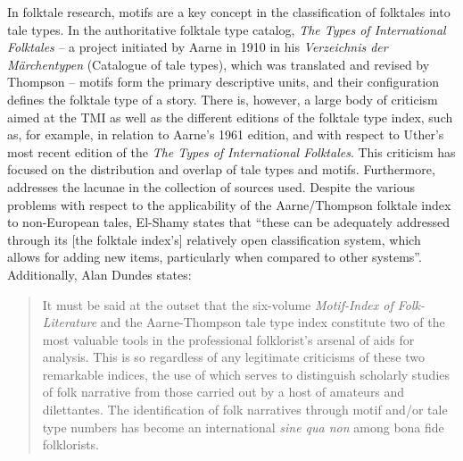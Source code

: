 In folktale research, motifs are a key concept in the classification of folktales into tale types. In the authoritative folktale type catalog, \emph{The Types of International Folktales}\autocite{uther:2004} -- a project initiated by Aarne in 1910 in his \emph{Verzeichnis der Märchentypen} (Catalogue of tale types)\autocite{aarne:1910}, which was translated and revised by Thompson\autocite{aarne:1928,aarne:1961} -- motifs form the primary descriptive units, and their configuration defines the folktale type of a story. There is, however, a large body of criticism aimed at the TMI as well as the different editions of the folktale type index, such as, for example, \citeauthor{dundes:1997} in relation to Aarne's 1961 edition\autocite{dundes:1997}, and \citeauthor{karsdorp:2012} with respect to Uther's most recent edition of the \emph{The Types of International Folktales}\autocite{karsdorp:2012}. This criticism has focused on the distribution and overlap of tale types and motifs. Furthermore, \citeauthor{el-shamy:1980} addresses the lacunae in the collection of sources used\autocite{el-shamy:1980}. Despite the various problems with respect to the applicability of the Aarne/Thompson folktale index to non-European tales, El-Shamy states that ``these can be adequately addressed through its [the folktale index's] relatively open classification system, which allows for adding new items, particularly when compared to other systems''\autocite[158]{el-shamy:1988}. Additionally, Alan Dundes states:
\begin{quote}
    It must be said at the outset that the six-volume \emph{Motif-Index of Folk-Literature} and the Aarne-Thompson tale type index constitute two of the most valuable tools in the professional folklorist's arsenal of aids for analysis. This is so regardless of any legitimate criticisms of these two remarkable indices, the use of which serves to distinguish scholarly studies of folk narrative from those carried out by a host of amateurs and dilettantes. The identification of folk narratives through motif and/or tale type numbers has become an international \emph{sine qua non} among bona fide folklorists.\autocite[195]{dundes:1997}
\end{quote}
